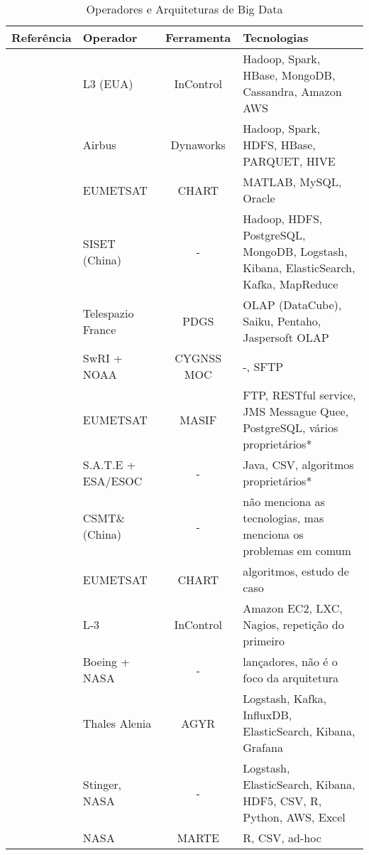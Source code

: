 \begin{table}[!ht]%
  \begin{center}
  \caption{Operadores e Arquiteturas de Big Data}
  \begin{tabular}{|m{8em}|m{6em}|c|m{10em}|}
			\hline
			Referência & Operador & Ferramenta & Tecnologias \\
			\hline
			\cite{adamskiDataAnalyticsLarge2016} & L3 (EUA) & InControl & Hadoop, Spark, HBase, MongoDB, Cassandra, Amazon AWS \\
			\hline
			\cite{boussoufBigDataBased2018} & Airbus & Dynaworks & Hadoop, Spark, HDFS, HBase, PARQUET, HIVE \\
			\hline
			\cite{schulsterCHARTingFutureOffline2018} & EUMETSAT & CHART & MATLAB, MySQL, Oracle \\
			\hline
			\cite{zhangBigDataFramework2017} & SISET (China) & - & Hadoop, HDFS, PostgreSQL, MongoDB, Logstash, Kibana, ElasticSearch, Kafka, MapReduce \\
			\hline
			\cite{yvernesCopernicusGroundSegment2018} & Telespazio France & PDGS & OLAP (DataCube), Saiku, Pentaho, Jaspersoft OLAP \\
			\hline
			\cite{dischnerCYGNSSMOCMeeting2016} & SwRI + NOAA & CYGNSS MOC & -, SFTP \\
			\hline
			\cite{edwardsDealingBigData2018} & EUMETSAT & MASIF & FTP, RESTful service, JMS Messague Quee, PostgreSQL, vários proprietários* \\
			\hline
			\cite{evansDataMiningDrastically2016} & S.A.T.E + ESA/ESOC & - & Java, CSV, algoritmos proprietários* \\
			\hline
			\cite{fenManagementOperationCommunication2016} & CSMT\& (China) & - & não menciona as tecnologias, mas menciona os problemas em comum \\
			\hline
			\cite{trollopeAnalysisAutomatedTechniques2018} & EUMETSAT & CHART & algoritmos, estudo de caso \\
			\hline
			\cite{gillesFlyingLargeConstellations2016} & L-3 & InControl & Amazon EC2, LXC, Nagios, repetição do primeiro \\
			\hline
			\cite{highsmithSpaceLaunchSystem2015} & Boeing + NASA & - & lançadores, não é o foco da arquitetura \\
			\hline
			\cite{hennionBigdataSatelliteYearly2018} & Thales Alenia & AGYR & Logstash, Kafka, InfluxDB, ElasticSearch, Kibana, Grafana \\
			\hline
			\cite{mateikUsingBigData2017} & Stinger, NASA & - & Logstash, ElasticSearch, Kibana, HDF5, CSV, R, Python, AWS, Excel \\
			\hline
			\cite{fernandezTelemetryAnomalyDetection2017} & NASA & MARTE & R, CSV, ad-hoc \\
			\hline
    \end{tabular}
    \end{center}
\end{table}


